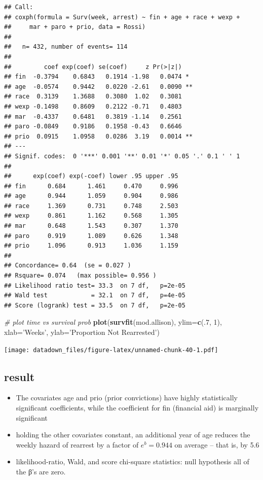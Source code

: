 \documentclass[]{book}
\newenvironment{Shaded}{\begin{snugshade}}{\end{snugshade}}
\newcommand{\CommentTok}[1]{\textcolor[rgb]{0.56,0.35,0.01}{\textit{#1}}}
\newcommand{\DataTypeTok}[1]{\textcolor[rgb]{0.13,0.29,0.53}{#1}}
\newcommand{\DecValTok}[1]{\textcolor[rgb]{0.00,0.00,0.81}{#1}}
\newcommand{\KeywordTok}[1]{\textcolor[rgb]{0.13,0.29,0.53}{\textbf{#1}}}
\newcommand{\NormalTok}[1]{#1}
\newcommand{\StringTok}[1]{\textcolor[rgb]{0.31,0.60,0.02}{#1}}
\providecommand{\tightlist}{%
  \setlength{\itemsep}{0pt}\setlength{\parskip}{0pt}}
\begin{document}
\begin{verbatim}
## Call:
## coxph(formula = Surv(week, arrest) ~ fin + age + race + wexp + 
##     mar + paro + prio, data = Rossi)
## 
##   n= 432, number of events= 114 
## 
##         coef exp(coef) se(coef)     z Pr(>|z|)   
## fin  -0.3794    0.6843   0.1914 -1.98   0.0474 * 
## age  -0.0574    0.9442   0.0220 -2.61   0.0090 **
## race  0.3139    1.3688   0.3080  1.02   0.3081   
## wexp -0.1498    0.8609   0.2122 -0.71   0.4803   
## mar  -0.4337    0.6481   0.3819 -1.14   0.2561   
## paro -0.0849    0.9186   0.1958 -0.43   0.6646   
## prio  0.0915    1.0958   0.0286  3.19   0.0014 **
## ---
## Signif. codes:  0 '***' 0.001 '**' 0.01 '*' 0.05 '.' 0.1 ' ' 1
## 
##      exp(coef) exp(-coef) lower .95 upper .95
## fin      0.684      1.461     0.470     0.996
## age      0.944      1.059     0.904     0.986
## race     1.369      0.731     0.748     2.503
## wexp     0.861      1.162     0.568     1.305
## mar      0.648      1.543     0.307     1.370
## paro     0.919      1.089     0.626     1.348
## prio     1.096      0.913     1.036     1.159
## 
## Concordance= 0.64  (se = 0.027 )
## Rsquare= 0.074   (max possible= 0.956 )
## Likelihood ratio test= 33.3  on 7 df,   p=2e-05
## Wald test            = 32.1  on 7 df,   p=4e-05
## Score (logrank) test = 33.5  on 7 df,   p=2e-05
\end{verbatim}

\begin{Shaded}
\begin{Highlighting}[]
\CommentTok{# plot time vs survival prob}
\KeywordTok{plot}\NormalTok{(}\KeywordTok{survfit}\NormalTok{(mod.allison), }\DataTypeTok{ylim=}\KeywordTok{c}\NormalTok{(.}\DecValTok{7}\NormalTok{, }\DecValTok{1}\NormalTok{), }\DataTypeTok{xlab=}\StringTok{'Weeks'}\NormalTok{, }\DataTypeTok{ylab=}\StringTok{'Proportion Not Rearrested'}\NormalTok{)}
\end{Highlighting}
\end{Shaded}

\texttt{[image: datadown\_files/figure-latex/unnamed-chunk-40-1.pdf]}

\hypertarget{result}{%
\subsection{result}\label{result}}

\begin{itemize}
\tightlist
\item
  The covariates age and prio (prior convictions) have highly statistically significant coefficients, while the coefficient for fin (financial aid) is marginally significant
\item
  holding the other covariates constant, an additional year of age reduces the weekly hazard of rearrest by a factor of \(e^b = 0.944\) on average -- that is, by 5.6
\item
  likelihood-ratio, Wald, and score chi-square statistics: null hypothesis all of the β's are zero.
\end{itemize}
\end{document}

